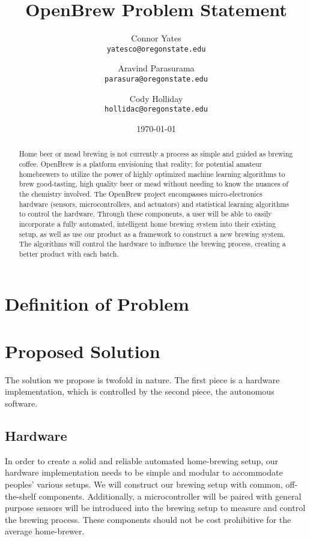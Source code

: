 \documentclass[letterpaper,10pt]{article}
\author{Connor Yates\\
\texttt{yatesco@oregonstate.edu}
\and
Aravind Parasurama\\
\texttt{parasura@oregonstate.edu}
\and
Cody Holliday\\
\texttt{hollidac@oregonstate.edu}}
\date{\today}
\title{OpenBrew Problem Statement}
\begin{document}
\maketitle

\begin{abstract}
	Home beer or mead brewing is not currently a process as simple and guided as brewing
	coffee. OpenBrew is a platform envisioning that reality; for potential amateur homebrewers 
	to utilize the power of highly optimized machine learning algorithms to brew good-tasting, 
	high quality beer or mead without needing to know the nuances of the chemistry involved. 
	The OpenBrew project encompasses micro-electronics hardware (sensors, microcontrollers, 
	and actuators) and statistical learning algorithms to control the hardware. Through these 
	components, a user will be able to easily incorporate a fully automated, intelligent home 
	brewing system into their existing setup, as well as use our product as a framework to 
	construct a new brewing system. The algorithms will control the hardware to influence the 
	brewing process, creating a better product with each batch.
\end{abstract}

\newpage

\section{Definition of Problem}

\section{Proposed Solution}
The solution we propose is twofold in nature.
The first piece is a hardware implementation, which is controlled by the second piece, 
the autonomous software.

\subsection{Hardware}
In order to create a solid and reliable automated home-brewing setup, our hardware 
implementation needs to be simple and modular to accommodate peoples' various setups.
We will construct our brewing setup with common, off-the-shelf components.
Additionally, a microcontroller will be paired with general purpose sensors will be 
introduced into the brewing setup to measure and control the brewing process.
These components should not be cost prohibitive for the average home-brewer.
\end{document}
